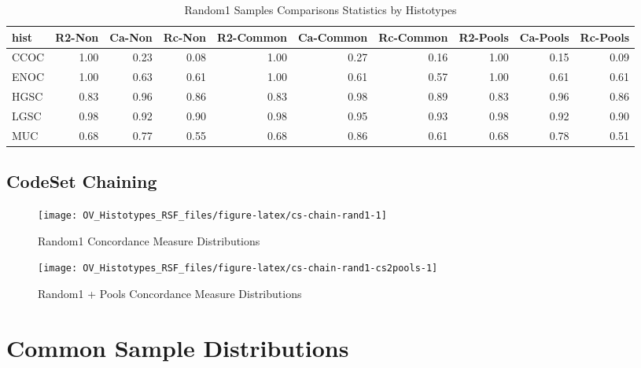 \documentclass[
]{report}
\begin{document}
\begin{table}

\caption{\label{tab:rand1-vs-pools-stats}Random1 Samples Comparisons Statistics by Histotypes}
\centering
\begin{tabular}[t]{l|r|r|r|r|r|r|r|r|r}
\hline
hist & R2-Non & Ca-Non & Rc-Non & R2-Common & Ca-Common & Rc-Common & R2-Pools & Ca-Pools & Rc-Pools\\
\hline
CCOC & 1.00 & 0.23 & 0.08 & 1.00 & 0.27 & 0.16 & 1.00 & 0.15 & 0.09\\
\hline
ENOC & 1.00 & 0.63 & 0.61 & 1.00 & 0.61 & 0.57 & 1.00 & 0.61 & 0.61\\
\hline
HGSC & 0.83 & 0.96 & 0.86 & 0.83 & 0.98 & 0.89 & 0.83 & 0.96 & 0.86\\
\hline
LGSC & 0.98 & 0.92 & 0.90 & 0.98 & 0.95 & 0.93 & 0.98 & 0.92 & 0.90\\
\hline
MUC & 0.68 & 0.77 & 0.55 & 0.68 & 0.86 & 0.61 & 0.68 & 0.78 & 0.51\\
\hline
\end{tabular}
\end{table}

\hypertarget{codeset-chaining}{%
\subsection{CodeSet Chaining}\label{codeset-chaining}}

\begin{figure}[H]

{\centering \texttt{[image: OV\_Histotypes\_RSF\_files/figure-latex/cs-chain-rand1-1]} 

}

\caption{Random1 Concordance Measure Distributions}\label{fig:cs-chain-rand1}
\end{figure}

\begin{figure}[H]

{\centering \texttt{[image: OV\_Histotypes\_RSF\_files/figure-latex/cs-chain-rand1-cs2pools-1]} 

}

\caption{Random1 + Pools Concordance Measure Distributions}\label{fig:cs-chain-rand1-cs2pools}
\end{figure}

\hypertarget{common-sample-distributions}{%
\section{Common Sample Distributions}\label{common-sample-distributions}}
\end{document}
